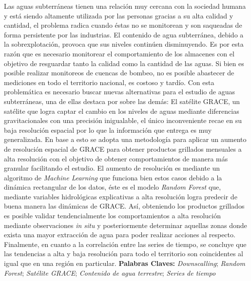 Las aguas subterráneas tienen una relación muy cercana con la sociedad humana y está siendo altamente utilizada por las personas gracias a su
alta calidad y cantidad, el problema radica cuando éstas no se monitorean y son saqueadas de forma persistente por las industrias. El contenido de agua
subterránea, debido a la sobrexplotación, provoca que sus niveles continúen disminuyendo. Es por esta razón que es necesario monitorear el comportamiento de 
los almacenes con el objetivo de resguardar tanto la calidad como la cantidad de las aguas. Si bien es posible realizar monitoreos de cuencas de bombeo, no es 
posible abastecer de mediciones en todo el territorio nacional, es costoso y tardío. Con esta problemática es necesario buscar nuevas alternativas para el estudio de 
aguas subterráneas, una de ellas destaca por sobre las demás: El satélite GRACE, un satélite que logra captar el cambio en los niveles de aguas mediante diferencias gravitacionales con una precisión inigualable,
el único inconveniente recae en su baja resolución espacial por lo que la información que entrega es muy
generalizada. En base a esto se adopta una metodología para aplicar un aumento de resolución espacial de GRACE para obtener productos grillados mensuales a alta resolución con el 
objetivo de obtener comportamientos de manera más granular facilitando el estudio. El aumento de resolución es mediante un algoritmo de \textit{Machine Learning} que funciona bien estos casos 
debido a la dinámica rectangular de los datos, éste es el modelo \textit{Random Forest} que, mediante variables hidrológicas explicativas a alta resolución logra predecir de buena manera 
las dinámicas de GRACE. Así, obteniendo los productos grillados es posible validar tendencialmente
los comportamientos a alta resolución mediante observaciones \textit{in situ} y posteriormente determinar aquellas zonas donde exista una mayor extracción de agua para poder realizar acciones al respecto.
Finalmente, en cuanto a la correlación entre las series de tiempo, se concluye que las tendencias a alta y baja resolución para todo el territorio son coincidentes al igual que en una región en particular.
\vskip 0.2in
\noindent
{\bf Palabras Claves:} \textit{Downscalling}; \textit{Random Forest}; \textit{Satélite GRACE}; \textit{Contenido de agua terrestre}; \textit{Series de tiempo}
